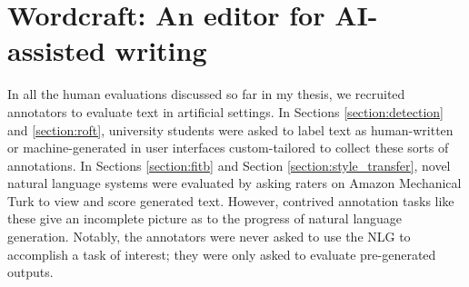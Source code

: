 

\section{Wordcraft: An editor for AI-assisted writing}
\label{section:wordcraft}

In all the human evaluations discussed so far in my thesis, we recruited annotators to evaluate text in artificial settings.
In Sections \ref{section:detection} and \ref{section:roft}, university students were asked to label text as human-written or machine-generated in user interfaces custom-tailored to collect these sorts of annotations.
In Sections \ref{section:fitb} and Section \ref{section:style_transfer}, novel natural language systems were evaluated by asking raters on Amazon Mechanical Turk to view and score generated text.
However, contrived annotation tasks like these give an incomplete picture as to the progress of natural language generation.
Notably, the annotators were never asked to use the NLG to accomplish a task of interest; they were only asked to evaluate pre-generated outputs.

